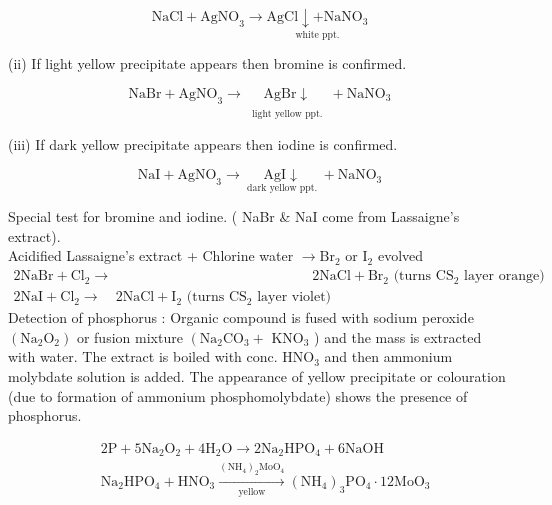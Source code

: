 \documentclass[10pt]{article}
\begin{document}
$$
\mathrm{NaCl}+\mathrm{AgNO}_{3} \longrightarrow \underset{\text { white ppt. }}{\mathrm{AgCl} \downarrow+\mathrm{NaNO}_{3}}
$$

(ii) If light yellow precipitate appears then bromine is confirmed.

$$
\mathrm{NaBr}+\mathrm{AgNO}_{3} \longrightarrow \underset{\substack{ \\\text { light yellow ppt. }}}{\mathrm{AgBr} \downarrow}+\mathrm{NaNO}_{3}
$$

(iii) If dark yellow precipitate appears then iodine is confirmed.

$$
\mathrm{NaI}+\mathrm{AgNO}_{3} \longrightarrow \underset{\text { dark yellow ppt. }}{\mathrm{AgI} \downarrow}+\mathrm{NaNO}_{3}
$$

Special test for bromine and iodine. ( NaBr \& NaI come from Lassaigne's extract).\\
Acidified Lassaigne's extract + Chlorine water $\longrightarrow \mathrm{Br}_{2}$ or $\mathrm{I}_{2}$ evolved\\
$\begin{array}{ll}2 \mathrm{NaBr}+\mathrm{Cl}_{2} \longrightarrow & 2 \mathrm{NaCl}+\mathrm{Br}_{2} \text { (turns } \mathrm{CS}_{2} \text { layer orange) } \\ 2 \mathrm{NaI}+\mathrm{Cl}_{2} \longrightarrow \quad 2 \mathrm{NaCl}+\mathrm{I}_{2} \text { (turns } \mathrm{CS}_{2} \text { layer violet) }\end{array}$\\
Detection of phosphorus : Organic compound is fused with sodium peroxide $\left(\mathrm{Na}_{2} \mathrm{O}_{2}\right)$ or fusion mixture $\left(\mathrm{Na}_{2} \mathrm{CO}_{3}+\right.$ $\mathrm{KNO}_{3}$ ) and the mass is extracted with water. The extract is boiled with conc. $\mathrm{HNO}_{3}$ and then ammonium molybdate solution is added. The appearance of yellow precipitate or colouration (due to formation of ammonium phosphomolybdate) shows the presence of phosphorus.

$$
\begin{aligned}
& 2 \mathrm{P}+5 \mathrm{Na}_{2} \mathrm{O}_{2}+4 \mathrm{H}_{2} \mathrm{O} \longrightarrow 2 \mathrm{Na}_{2} \mathrm{HPO}_{4}+6 \mathrm{NaOH} \\
& \mathrm{Na}_{2} \mathrm{HPO}_{4}+\mathrm{HNO}_{3} \xrightarrow[\text { yellow }]{\left(\mathrm{NH}_{4}\right)_{2} \mathrm{MoO}_{4}}\left(\mathrm{NH}_{4}\right)_{3} \mathrm{PO}_{4} \cdot 12 \mathrm{MoO}_{3}
\end{aligned}
$$
\end{document}
